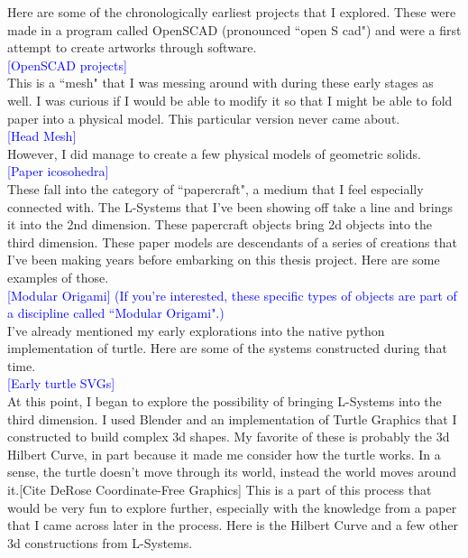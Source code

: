 \documentclass[12pt,twoside]{reedthesis}
\begin{document}
	Here are some of the chronologically earliest projects that I explored. These were made in a program called OpenSCAD (pronounced ``open S cad") and were a first attempt to create artworks through software.\\
	
	\textcolor{blue}{[OpenSCAD projects]}\\
	
	This is a ``mesh" that I was messing around with during these early stages as well. I was curious if I would be able to modify it so that I might be able to fold paper into a physical model. This particular version never came about.\\
	
	\textcolor{blue}{[Head Mesh]}\\
	
	However, I did manage to create a few physical models of geometric solids.\\
	
	\textcolor{blue}{[Paper icosohedra]}\\
	
	These fall into the category of ``papercraft", a medium that I feel especially connected with. The L-Systems that I've been showing off take a line and brings it into the 2nd dimension. These papercraft objects bring 2d objects into the third dimension. These paper models are descendants of a series of creations that I've been making years before embarking on this thesis project. Here are some examples of those.\\
	
	\textcolor{blue}{[Modular Origami] (If you're interested, these specific types of objects are part of a discipline called ``Modular Origami".)}\\
	
	I've already mentioned my early explorations into the native python implementation of turtle. Here are some of the systems constructed during that time.\\
	
	\textcolor{blue}{[Early turtle SVGs]}\\
	
	At this point, I began to explore the possibility of bringing L-Systems into the third dimension. I used Blender and an implementation of Turtle Graphics that I constructed to build complex 3d shapes. My favorite of these is probably the 3d Hilbert Curve, in part because it made me consider how the turtle works. In a sense, the turtle doesn't move through its world, instead the world moves around it.[Cite DeRose Coordinate-Free Graphics] This is a part of this process that would be very fun to explore further, especially with the knowledge from a paper that I came across later in the process. Here is the Hilbert Curve and a few other 3d constructions from L-Systems.\\
	
\end{document}
